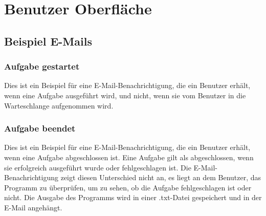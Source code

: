 \documentclass[a4paper,12pt]{article}
\begin{document}
\clearpage
\section{Benutzer Oberfläche}

\subsection {Beispiel E-Mails}
\subsubsection{Aufgabe gestartet}
Dies ist ein Beispiel für eine E-Mail-Benachrichtigung, die ein Benutzer erhält, wenn eine Aufgabe ausgeführt wird, und nicht, wenn sie vom Benutzer in die Warteschlange aufgenommen wird. \\
\begin{center}
\end{center}

\clearpage
\subsubsection{Aufgabe beendet}
Dies ist ein Beispiel für eine E-Mail-Benachrichtigung, die ein Benutzer erhält, wenn eine Aufgabe abgeschlossen ist. Eine Aufgabe gilt als abgeschlossen, wenn sie erfolgreich ausgeführt wurde oder fehlgeschlagen ist. Die E-Mail-Benachrichtigung zeigt diesen Unterschied nicht an, es liegt an dem Benutzer, das Programm zu überprüfen, um zu sehen, ob die Aufgabe fehlgeschlagen ist oder nicht. Die Ausgabe des Programms wird in einer .txt-Datei gespeichert und in der E-Mail angehängt. \\
\end{document}
